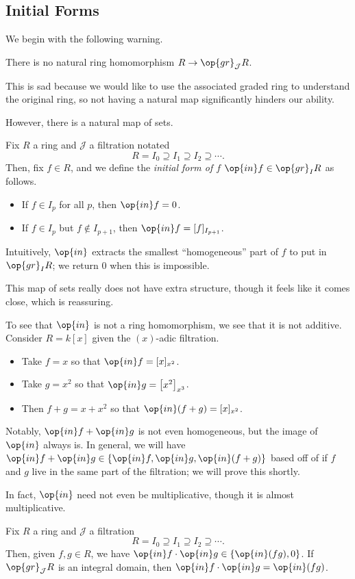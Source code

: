 \subsection{Initial Forms}
We begin with the following warning.
\begin{warn}
	There is no natural ring homomorphism $R\to\op{gr}_{\mathcal J}R$.
\end{warn}
This is sad because we would like to use the associated graded ring to understand the original ring, so not having a natural map significantly hinders our ability.

However, there is a natural map of sets.
\begin{definition}
	Fix $R$ a ring and $\mathcal J$ a filtration notated
	\[R=I_0\supseteq I_1\supseteq I_2\supseteq\cdots.\]
	Then, fix $f\in R$, and we define the \textit{initial form of $f$} $\op{in}f\in\op{gr}_IR$ as follows.
	\begin{itemize}
		\item If $f\in I_p$ for all $p$, then $\op{in}f=0$.
		\item If $f\in I_p$ but $f\notin I_{p+1}$, then $\op{in}f=[f]_{I_{p+1}}$.
	\end{itemize}
	Intuitively, $\op{in}$ extracts the smallest ``homogeneous'' part of $f$ to put in $\op{gr}_IR$; we return $0$ when this is impossible.
\end{definition}
This map of sets really does not have extra structure, though it feels like it comes close, which is reassuring.
\begin{remark}[Nir]
	To see that $\op{in}$ is not a ring homomorphism, we see that it is not additive. Consider $R=k[x]$ given the $(x)$-adic filtration.
	\begin{itemize}
		\item Take $f=x$ so that $\op{in}f=[x]_{x^2}$.
		\item Take $g=x^2$ so that $\op{in}g=\left[x^2\right]_{x^3}$.
		\item Then $f+g=x+x^2$ so that $\op{in}(f+g)=[x]_{x^2}$.
	\end{itemize}
	Notably, $\op{in}f+\op{in}g$ is not even homogeneous, but the image of $\op{in}$ always is. In general, we will have $\op{in}f+\op{in}g\in\{\op{in}f,\op{in}g,\op{in}(f+g)\}$ based off of if $f$ and $g$ live in the same part of the filtration; we will prove this shortly.
\end{remark}
In fact, $\op{in}$ need not even be multiplicative, though it is almost multiplicative.
\begin{proposition} \label{prop:multinitialform}
	Fix $R$ a ring and $\mathcal J$ a filtration
	\[R=I_0\supseteq I_1\supseteq I_2\supseteq\cdots.\]
	Then, given $f,g\in R$, we have $\op{in}f\cdot\op{in}g\in\{\op{in}(fg),0\}$. If $\op{gr}_\mathcal JR$ is an integral domain, then $\op{in}f\cdot\op{in}g=\op{in}(fg)$.
\end{proposition}
